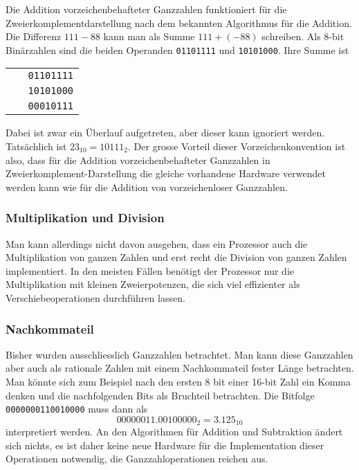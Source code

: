 Die Addition vorzeichenbehafteter Ganzzahlen funktioniert für die
Zweierkomplementdarstellung nach dem bekannten Algorithmus für die
Addition.
Die Differenz $111-88$ kann man als Summe $111+(-88)$ schreiben.
Als 8-bit Binärzahlen sind die beiden Operanden
\texttt{01101111} und \texttt{10101000}.
Ihre Summe ist
\begin{center}
\begin{tabular}{>{\tt}r}
01101111\\
10101000\\
\hline
{\color{gray}}\,
00010111\\
\end{tabular}
\end{center}
Dabei ist zwar ein Überlauf aufgetreten, aber dieser kann ignoriert
werden.
Tatsächlich ist $23_{10}=10111_2$.
Der grosse Vorteil dieser Vorzeichenkonvention ist also, dass
für die Addition vorzeichenbehafteter Ganzzahlen in
Zweierkomplement-Darstellung die gleiche vorhandene Hardware verwendet
werden kann wie für die Addition von vorzeichenloser Ganzzahlen.

\subsubsection{Multiplikation und Division}
Man kann allerdings nicht davon ausgehen, dass ein Prozessor auch
die Multiplikation von ganzen Zahlen und erst recht die Division
von ganzen Zahlen implementiert.
In den meisten Fällen benötigt der Prozessor nur die Multiplikation
mit kleinen Zweierpotenzen, die sich viel effizienter als
Verschiebeoperationen durchführen lassen.

\subsubsection{Nachkommateil}
Bisher wurden ausschliesslich Ganzzahlen betrachtet.
Man kann diese Ganzzahlen aber auch als rationale Zahlen mit einem
Nachkommateil fester Länge betrachten.
Man könnte sich zum Beispiel nach den ersten 8 bit einer 16-bit Zahl
ein Komma denken und die nachfolgenden Bits als Bruchteil
betrachten.
Die Bitfolge \texttt{0000000110010000} muss dann als
\[
00000011.00100000_2
=
3.125_{10}
\]
interpretiert werden.
An den Algorithmen für Addition und Subtraktion ändert sich nichts,
es ist daher keine neue Hardware für die Implementation dieser
Operationen notwendig, die Ganzzahloperationen reichen aus.

